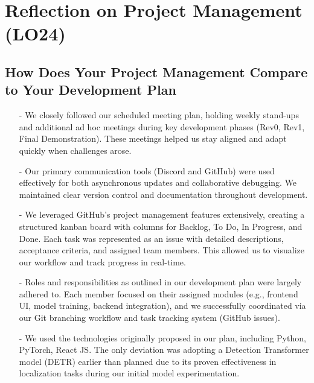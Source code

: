 \documentclass{article}
\begin{document}
\section{Reflection on Project Management (LO24)}

\subsection{How Does Your Project Management Compare to Your Development Plan}
\begin{enumerate}
    \item[-] We closely followed our scheduled meeting plan, holding weekly stand-ups and additional ad hoc meetings during key development phases (Rev0, Rev1, Final Demonstration). These meetings helped us stay aligned and adapt quickly when challenges arose. 
    \item[-] Our primary communication tools (Discord and GitHub) were used effectively for both asynchronous updates and collaborative debugging. We maintained clear version control and documentation throughout development. 
    \item[-] We leveraged GitHub's project management features extensively, creating a structured kanban board with columns for Backlog, To Do, In Progress, and Done. Each task was represented as an issue with detailed descriptions, acceptance criteria, and assigned team members. This allowed us to visualize our workflow and track progress in real-time.
    \item[-] Roles and responsibilities as outlined in our development plan were largely adhered to. Each member focused on their assigned modules (e.g., frontend UI, model training, backend integration), and we successfully coordinated via our Git branching workflow and task tracking system (GitHub issues).
    \item[-] We used the technologies originally proposed in our plan, including Python, PyTorch, React JS. The only deviation was adopting a Detection Transformer model (DETR) earlier than planned due to its proven effectiveness in localization tasks during our initial model experimentation. 
\end{enumerate}
\end{document}
